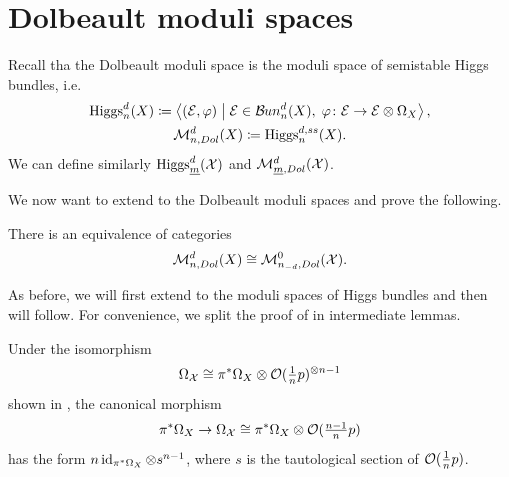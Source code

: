 \section{Dolbeault moduli spaces}\label{section: dolbeault moduli spaces}

Recall tha the Dolbeault moduli space is the moduli space of semistable Higgs bundles, i.e.
\begin{gather}
\operatorname{Higgs}_n^d(X) \coloneqq \left< (\mathcal{E}, \varphi) \;\middle|\; \mathcal{E} \in \mathcal{B}\kern -.5pt un_n^d(X), \; \varphi\colon \mathcal{E} \to \mathcal{E} \otimes \Omega_X \right>,\\
\mathcal{M}_{n, Dol}^d(X) \coloneqq \operatorname{Higgs}_n^{d, ss}(X).
\end{gather}
We can define similarly $\operatorname{Higgs}_{\underline{m}}^d(\mathcal{X})$ and $\mathcal{M}_{\underline{m}, Dol}^d(\mathcal{X})$.

We now want to extend  to the Dolbeault moduli spaces and prove the following.
\begin{thm} \label{thm: eqv Dol}
There is an equivalence of categories
\begin{equation} \label{equivalence dol}
\mathcal{M}_{n, Dol}^d(X) \cong \mathcal{M}_{n_{-d}, Dol}^0(\mathcal{X}).
\end{equation}
\end{thm}

As before, we will first extend  to the moduli spaces of Higgs bundles and then  will follow. For convenience, we split the proof of  in intermediate lemmas.

\begin{lemma}
Under the isomorphism
\begin{equation}
\Omega_{\mathcal{X}} \cong \pi^* \Omega_X \otimes \mathcal{O}(\tfrac{1}{n}p)^{\otimes n-1}
\end{equation}
shown in , the canonical morphism
\begin{equation} \label{eq: canonical morphism cotangent}
\pi^* \Omega_X \to \Omega_{\mathcal{X}} \cong \pi^*\Omega_X \otimes \mathcal{O}(\tfrac{n-1}{n}p)
\end{equation}
has the form $n \operatorname{id}_{\pi^* \Omega_X} \otimes s^{n-1}$, where $s$ is the tautological section of $\mathcal{O}(\tfrac{1}{n}p)$.
\end{lemma}

